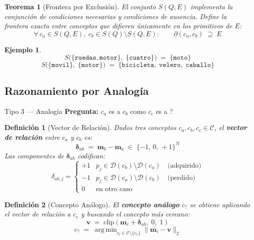 \documentclass[12pt]{article}
\newtheorem{theorem}{Teorema}[section]
\newtheorem{definition}{Definición}[section]
\newtheorem{example}{Ejemplo}[section]
\begin{document}
\begin{theorem}[Frontera por Exclusión]
	El conjunto $S(Q,E)$ implementa la conjunción de condiciones necesarias y
	condiciones de ausencia. Define la frontera exacta entre conceptos que
	difieren únicamente en los primitivos de $E$:
	\[
	\forall\, c_a \in S(Q,E),\; c_b \in S(Q) \setminus S(Q,E):
	\qquad
	\partial(c_a, c_b) \;\supseteq\; E
	\]
\end{theorem}

\begin{example}
	\[
	S\!\bigl(\{\texttt{ruedas},\texttt{motor}\},\;\{\texttt{cuatro}\}\bigr)
	\;=\; \{\texttt{moto}\}
	\]
	\[
	S\!\bigl(\{\texttt{movil}\},\;\{\texttt{motor}\}\bigr)
	\;=\; \{\texttt{bicicleta},\;\texttt{velero},\;\texttt{caballo}\}
	\]
\end{example}

\subsection{Razonamiento por Analogía}

\begin{razonbox}{Tipo 3 — Analogía}
	\textbf{Pregunta:} $c_a$ es a $c_b$ como $c_c$ es a \underline{\hspace{1cm}}?
\end{razonbox}

\begin{definition}[Vector de Relación]
	Dados tres conceptos $c_a, c_b, c_c \in \mathcal{C}$, el \textbf{vector de
		relación} entre $c_a$ y $c_b$ es:
	\[
	\bm{\delta}_{ab} \;=\; \mathbf{m}_b - \mathbf{m}_a \;\in\; \{-1,\,0,\,+1\}^N
	\]
	Las componentes de $\bm{\delta}_{ab}$ codifican:
	\[
	\delta_{ab,j} =
	\begin{cases}
		+1 & p_j \in \mathcal{D}(c_b) \setminus \mathcal{D}(c_a)
		\quad\text{(adquirido)}\\
		-1 & p_j \in \mathcal{D}(c_a) \setminus \mathcal{D}(c_b)
		\quad\text{(perdido)}\\
		0 & \text{en otro caso}
	\end{cases}
	\]
\end{definition}

\begin{definition}[Concepto Análogo]
	El \textbf{concepto análogo} $c_?$ se obtiene aplicando el vector de relación
	a $c_c$ y buscando el concepto más cercano:
	\[
	\mathbf{v} \;=\; \mathrm{clip}\!\left(
	\mathbf{m}_c + \bm{\delta}_{ab},\; 0,\; 1
	\right)
	\]
	\[
	c_? \;=\; \operatorname{arg\,min}_{c_i \in \mathcal{C} \setminus \{c_c\}}
	\bigl\|\mathbf{m}_i - \mathbf{v}\bigr\|_2
	\]
\end{definition}
\end{document}
